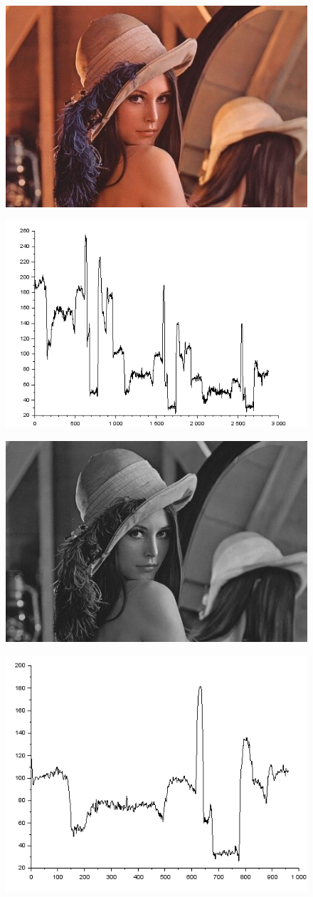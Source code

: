 \documentclass[12pt]{article}
\begin{document}
	\begin{figure}[h!]
		
		\centering
		\includegraphics[width=0.4\linewidth]{img/img6}
		\caption{}
		\label{fig:img6}
	\end{figure}
	
	
	\begin{figure}[h!]
		\centering
		\includegraphics[width=0.4\linewidth]{img/img81}
		\caption{}
		\label{fig:img81}
	\end{figure}
	
\begin{figure}[h!]
	\centering
	\includegraphics[width=0.4\linewidth]{img/img7}
	\caption{}
	\label{fig:img-7}
\end{figure}

\begin{figure}[h!]
	\centering
	\includegraphics[width=0.4\linewidth]{img/img8}
	\caption{}
	\label{fig:img8}
\end{figure}
\end{document}
